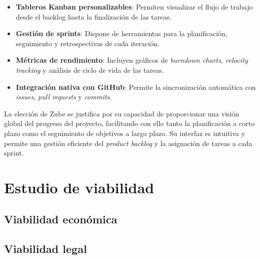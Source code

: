 \begin{itemize}
\tightlist
\item
\textbf{Tableros Kanban personalizables}: Permiten visualizar el flujo de trabajo desde el backlog hasta la finalización de las tareas.
\item
\textbf{Gestión de sprints}: Dispone de herramientas para la planificación, seguimiento y retrospectivas de cada iteración.
\item
\textbf{Métricas de rendimiento}: Incluyen gráficos de \emph{burndown charts}, \emph{velocity tracking} y análisis de ciclo de vida de las tareas.
\item
\textbf{Integración nativa con GitHub}: Permite la sincronización automática con \emph{issues}, \emph{pull requests} y \emph{commits}.
\end{itemize}

La elección de Zube se justifica por su capacidad de proporcionar una visión global del progreso del proyecto, facilitando con ello tanto la planificación a corto plazo como el seguimiento de objetivos a largo plazo. Su interfaz es intuitiva y permite una gestión eficiente del \emph{product backlog} y la asignación de tareas a cada sprint.

\section{Estudio de viabilidad}


\subsection{Viabilidad económica}


\subsection{Viabilidad legal}


